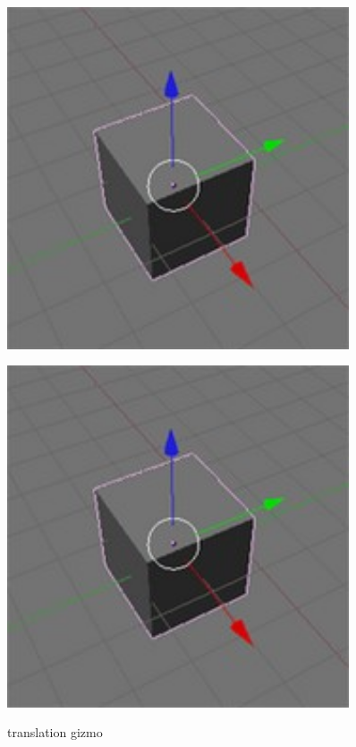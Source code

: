 \begin{figure}[htbp]
  \begin{minipage}{.5\textwidth}
    \centering
    \includegraphics[width=0.9\textwidth]{../assets/Manual-Manipulators-Translate.jpg}
  	\caption{translation gizmo \cite{blenderwiki}}
  \end{minipage}
  \begin{minipage}{.5\textwidth}
    \centering
    \includegraphics[width=0.9\textwidth]{../assets/Manual-Manipulators-Translate.jpg}\\

\end{minipage}
\end{figure}
